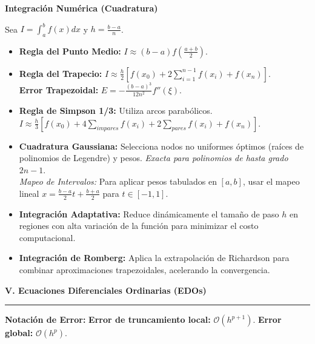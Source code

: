 \documentclass[10pt, landscape, twocolumn]{article}
\newcommand{\cheatsheetsection}[1]{
    \vspace{0.6em}
    {\color{themeblue}\large\bfseries #1} \par
    \vspace{-0.5em}
    {\color{themeblue}\rule{\linewidth}{1pt}} \par
    \vspace{0.2em}
}
\newcommand{\cheatsheetsubsection}[1]{
    \vspace{0.4em}
    {\color{themeblue}\normalsize\bfseries #1} \par
    \vspace{0.1em}
}
\begin{document}
\cheatsheetsubsection{Integración Numérica (Cuadratura)}
Sea $I = \int_a^b f(x)dx$ y $h = \frac{b-a}{n}$.
\begin{itemize}[leftmargin=*, nosep]
    \item \textbf{Regla del Punto Medio:} $I \approx (b-a) f(\frac{a+b}{2})$.
    \item \textbf{Regla del Trapecio:} $I \approx \frac{h}{2} [f(x_0) + 2\sum_{i=1}^{n-1} f(x_i) + f(x_n)]$. \\
    \textbf{Error Trapezoidal:} $E = -\frac{(b-a)^3}{12n^2} f''(\xi)$.
    \item \textbf{Regla de Simpson 1/3:} Utiliza arcos parabólicos.
    $I \approx \frac{h}{3} [f(x_0) + 4\sum_{impares} f(x_i) + 2\sum_{pares} f(x_i) + f(x_n)]$.
    \item \textbf{Cuadratura Gaussiana:} Selecciona nodos no uniformes óptimos (raíces de polinomios de Legendre) y pesos. \textit{Exacta para polinomios de hasta grado } $2n-1$. \\
    \textit{Mapeo de Intervalos:} Para aplicar pesos tabulados en $[a,b]$, usar el mapeo lineal $x = \frac{b-a}{2}t + \frac{b+a}{2}$ para $t \in [-1,1]$.
    \item \textbf{Integración Adaptativa:} Reduce dinámicamente el tamaño de paso $h$ en regiones con alta variación de la función para minimizar el costo computacional.
    \item \textbf{Integración de Romberg:} Aplica la extrapolación de Richardson para combinar aproximaciones trapezoidales, acelerando la convergencia.
\end{itemize}

\newpage
\cheatsheetsection{V. Ecuaciones Diferenciales Ordinarias (EDOs)}
\textbf{Notación de Error:} \textbf{Error de truncamiento local:} $\mathcal{O}(h^{p+1})$. \textbf{Error global:} $\mathcal{O}(h^p)$.
\end{document}
